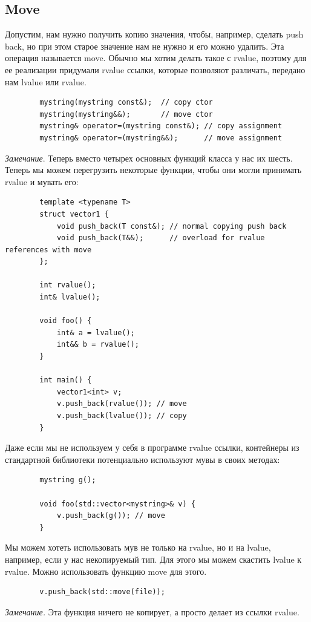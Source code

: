 \documentclass[12pt, a4paper]{article}
\begin{document}
	\subsection{Move}
	Допустим, нам нужно получить копию значения, чтобы, например, сделать push back, но при этом старое значение нам не нужно и его можно удалить. Эта операция называется move. Обычно мы хотим делать такое с rvalue, поэтому для ее реализации придумали rvalue ссылки, которые позволяют различать, передано нам lvalue или rvalue.
	\begin{verbatim}
		mystring(mystring const&);  // copy ctor
		mystring(mystring&&);       // move ctor
		mystring& operator=(mystring const&); // copy assignment
		mystring& operator=(mystring&&);      // move assignment
	\end{verbatim}
	\textit{Замечание}. Теперь вместо четырех основных функций класса у нас их шесть.\\
	Теперь мы можем перегрузить некоторые функции, чтобы они могли принимать rvalue и мувать его:
	\begin{verbatim}
		template <typename T>
		struct vector1 {
			void push_back(T const&); // normal copying push back
			void push_back(T&&);      // overload for rvalue references with move
		};
		
		int rvalue();
		int& lvalue();
		
		void foo() {
			int& a = lvalue();
			int&& b = rvalue();
		}
		
		int main() {
			vector1<int> v;
			v.push_back(rvalue()); // move
			v.push_back(lvalue()); // copy
		}
	\end{verbatim}
	Даже если мы не используем у себя в программе rvalue ссылки, контейнеры из стандартной библиотеки потенциально используют мувы в своих методах:
	\begin{verbatim}
		mystring g();
		
		void foo(std::vector<mystring>& v) {
			v.push_back(g()); // move
		}
	\end{verbatim}
	Мы можем хотеть использовать мув не только на rvalue, но и на lvalue, например, если у нас некопируемый тип. Для этого мы можем скастить lvalue к rvalue. Можно использовать функцию move для этого.
	\begin{verbatim}
		v.push_back(std::move(file));
	\end{verbatim}
	\textit{Замечание.} Эта функция ничего не копирует, а просто делает из ссылки rvalue.\\
\end{document}
